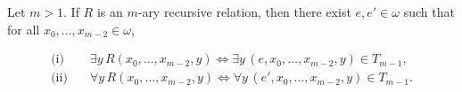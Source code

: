 Let $m > 1$. If $R$ is an $m$-ary recursive relation, then there exist $e, e' \in \omega$ such that for all $x_0, \dots, x_{m-2} \in \omega$,

\begin{align*}
\text{(i)}\quad &\exists y \, R(x_0, \dots, x_{m-2}, y) \iff \exists y \, (e, x_0, \dots, x_{m-2}, y) \in T_{m-1},\\
\text{(ii)}\quad &\forall y \, R(x_0, \dots, x_{m-2}, y) \iff \forall y \, (e', x_0, \dots, x_{m-2}, y) \in T_{m-1}.
\end{align*}
